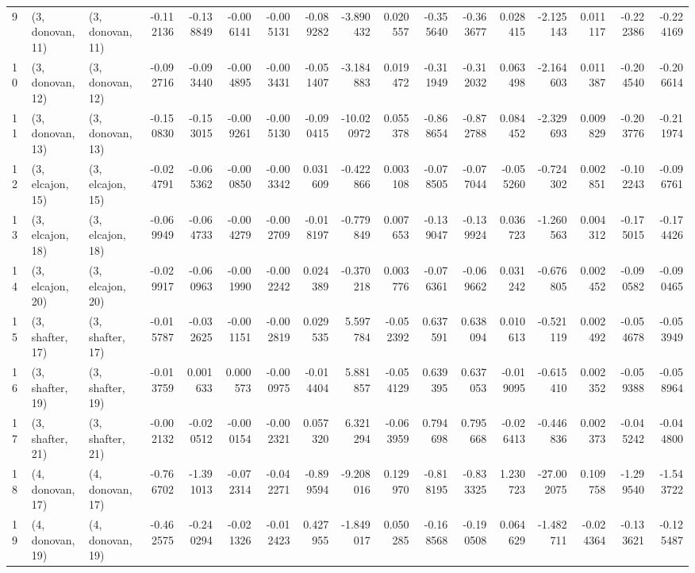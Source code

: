 \begin{tabular}{lllrrrrrrrrrrrrrr}
9  &  (3, donovan, 11) &  (3, donovan, 11) & -0.112136 & -0.138849 &  -0.006141 & -0.005131 & -0.089282 &  -3.890432 &  0.020557 &  -0.355640 & -0.363677 &  0.028415 &  -2.125143 &  0.011117 & -0.222386 & -0.224169 \\
10 &  (3, donovan, 12) &  (3, donovan, 12) & -0.092716 & -0.093440 &  -0.004895 & -0.003431 & -0.051407 &  -3.184883 &  0.019472 &  -0.311949 & -0.312032 &  0.063498 &  -2.164603 &  0.011387 & -0.204540 & -0.206614 \\
11 &  (3, donovan, 13) &  (3, donovan, 13) & -0.150830 & -0.153015 &  -0.009261 & -0.005130 & -0.090415 & -10.020972 &  0.055378 &  -0.868654 & -0.872788 &  0.084452 &  -2.329693 &  0.009829 & -0.203776 & -0.211974 \\
12 &  (3, elcajon, 15) &  (3, elcajon, 15) & -0.024791 & -0.065362 &  -0.000850 & -0.003342 &  0.031609 &  -0.422866 &  0.003108 &  -0.078505 & -0.077044 & -0.055260 &  -0.724302 &  0.002851 & -0.102243 & -0.096761 \\
13 &  (3, elcajon, 18) &  (3, elcajon, 18) & -0.069949 & -0.064733 &  -0.004279 & -0.002709 & -0.018197 &  -0.779849 &  0.007653 &  -0.139047 & -0.139924 &  0.036723 &  -1.260563 &  0.004312 & -0.175015 & -0.174426 \\
14 &  (3, elcajon, 20) &  (3, elcajon, 20) & -0.029917 & -0.060963 &  -0.001990 & -0.002242 &  0.024389 &  -0.370218 &  0.003776 &  -0.076361 & -0.069662 &  0.031242 &  -0.676805 &  0.002452 & -0.090582 & -0.090465 \\
15 &  (3, shafter, 17) &  (3, shafter, 17) & -0.015787 & -0.032625 &  -0.001151 & -0.002819 &  0.029535 &   5.597784 & -0.052392 &   0.637591 &  0.638094 &  0.010613 &  -0.521119 &  0.002492 & -0.054678 & -0.053949 \\
16 &  (3, shafter, 19) &  (3, shafter, 19) & -0.013759 &  0.001633 &   0.000573 & -0.000975 & -0.014404 &   5.881857 & -0.054129 &   0.639395 &  0.637053 & -0.019095 &  -0.615410 &  0.002352 & -0.059388 & -0.058964 \\
17 &  (3, shafter, 21) &  (3, shafter, 21) & -0.002132 & -0.020512 &  -0.000154 & -0.002321 &  0.057320 &   6.321294 & -0.063959 &   0.794698 &  0.795668 & -0.026413 &  -0.446836 &  0.002373 & -0.045242 & -0.044800 \\
18 &  (4, donovan, 17) &  (4, donovan, 17) & -0.766702 & -1.391013 &  -0.072314 & -0.042271 & -0.899594 &  -9.208016 &  0.129970 &  -0.818195 & -0.833325 &  1.230723 & -27.002075 &  0.109758 & -1.299540 & -1.543722 \\
19 &  (4, donovan, 19) &  (4, donovan, 19) & -0.462575 & -0.240294 &  -0.021326 & -0.012423 &  0.427955 &  -1.849017 &  0.050285 &  -0.168568 & -0.190508 &  0.064629 &  -1.482711 & -0.024364 & -0.133621 & -0.125487 \\

\end{tabular}
